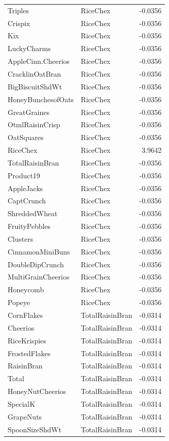 \begin{longtable}{llr}
Triples & RiceChex & -0.0356 \\
Crispix & RiceChex & -0.0356 \\
Kix & RiceChex & -0.0356 \\
LuckyCharms & RiceChex & -0.0356 \\
AppleCinn.Cheerios & RiceChex & -0.0356 \\
CracklinOatBran & RiceChex & -0.0356 \\
BigBiscuitShdWt & RiceChex & -0.0356 \\
HoneyBunchesofOats & RiceChex & -0.0356 \\
GreatGraines & RiceChex & -0.0356 \\
OtmlRaisinCrisp & RiceChex & -0.0356 \\
OatSquares & RiceChex & -0.0356 \\
RiceChex & RiceChex & 3.9642 \\
TotalRaisinBran & RiceChex & -0.0356 \\
Product19 & RiceChex & -0.0356 \\
AppleJacks & RiceChex & -0.0356 \\
CaptCrunch & RiceChex & -0.0356 \\
ShreddedWheat & RiceChex & -0.0356 \\
FruityPebbles & RiceChex & -0.0356 \\
Clusters & RiceChex & -0.0356 \\
CinnamonMiniBuns & RiceChex & -0.0356 \\
DoubleDipCrunch & RiceChex & -0.0356 \\
MultiGrainCheerios & RiceChex & -0.0356 \\
Honeycomb & RiceChex & -0.0356 \\
Popeye & RiceChex & -0.0356 \\
CornFlakes & TotalRaisinBran & -0.0314 \\
Cheerios & TotalRaisinBran & -0.0314 \\
RiceKrispies & TotalRaisinBran & -0.0314 \\
FrostedFlakes & TotalRaisinBran & -0.0314 \\
RaisinBran & TotalRaisinBran & -0.0314 \\
Total & TotalRaisinBran & -0.0314 \\
HoneyNutCheerios & TotalRaisinBran & -0.0314 \\
SpecialK & TotalRaisinBran & -0.0314 \\
GrapeNuts & TotalRaisinBran & -0.0314 \\
SpoonSizeShdWt & TotalRaisinBran & -0.0314 \\

\end{longtable}
